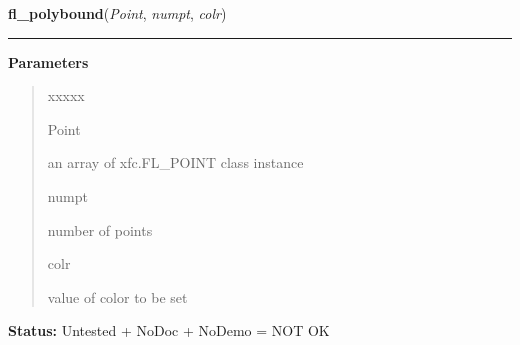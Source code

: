\hspace{.8\funcindent}\begin{boxedminipage}{\funcwidth}

    \raggedright \textbf{fl\_polybound}(\textit{Point}, \textit{numpt}, \textit{colr})

    \vspace{-1.5ex}

    \rule{\textwidth}{0.5\fboxrule}
\setlength{\parskip}{2ex}
\setlength{\parskip}{1ex}
      \textbf{Parameters}
      \vspace{-1ex}

      \begin{quote}
        \begin{Ventry}{xxxxx}

          \item[Point]

          an array of xfc.FL\_POINT class instance

          \item[numpt]

          number of points

          \item[colr]

          value of color to be set

        \end{Ventry}

      \end{quote}

\textbf{Status:} Untested + NoDoc + NoDemo = NOT OK



    \end{boxedminipage}

    \label{xformslib:library:fl_lines}

    \vspace{0.5ex}

